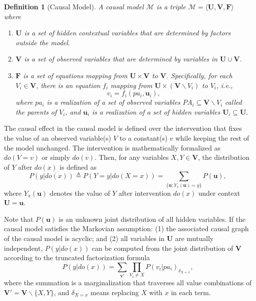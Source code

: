\documentclass{article}
\newtheorem{definition}{Definition}
\begin{document}
\begin{definition}[Causal Model]\label{def:cm}
A causal model $\mathcal{M}$ is a triple $\mathcal{M} = \langle \mathbf{U},\mathbf{V},\mathbf{F} \rangle$ where
\begin{enumerate}
	\item $\mathbf{U}$ is a set of hidden contextual variables that are determined by factors outside the model. %
	\item $\mathbf{V}$ is a set of observed variables that are determined by variables in $\mathbf{U}\cup\mathbf{V}$.
	\item $\mathbf{F}$ is a set of equations mapping from $\mathbf{U}\times \mathbf{V}$ to $\mathbf{V}$. Specifically, for each $V_{i}\in \mathbf{V}$, there is an equation $f_{i}$ mapping from $\mathbf{U}\times (\mathbf{V}\backslash V_{i})$ to $V_{i}$, i.e., 
	\begin{equation*}
	v_{i} = f_{i}(pa_{i},\mathbf{u}_{i}),
	\end{equation*}
	where $pa_{i}$ is a realization of a set of observed variables $PA_{i}\subseteq \mathbf{V}\backslash V_{i}$ called the parents of $V_{i}$, and $\mathbf{u}_{i}$ is a realization of a set of hidden variables $\mathbf{U}_{i}\subseteq \mathbf{U}$.
\end{enumerate}
\end{definition}

The causal effect in the causal model is defined over the intervention that fixes the value of an observed variable(s) $V$ to a constant(s) $v$ while keeping the rest of the model unchanged. The intervention is mathematically formalized as $do(V=v)$ or simply $do(v)$. Then, for any variables $X,Y\in \mathbf{V}$, the distribution of $Y$ after $do(x)$ is defined as \cite{pearl2009causality}
\begin{equation}\label{eq:pyx}
P(y|do(x)) \triangleq P(Y=y|do(X=x)) = \sum_{\{\mathbf{u}:Y_{x}(\mathbf{u})=y\}}P(\mathbf{u}),
\end{equation}
where $Y_{x}(\mathbf{u})$ denotes the value of $Y$ after intervention $do(x)$ under context $\mathbf{U}=\mathbf{u}$.

Note that $P(\mathbf{u})$ is an unknown joint distribution of all hidden variables. If the causal model satisfies the Markovian assumption: (1) the associated causal graph of the causal model is acyclic; and (2) all variables in $\mathbf{U}$ are mutually independent, $P(y|do(x))$ can be computed from the joint distribution of $\mathbf{V}$ according to the truncated factorization formula \cite{pearl2009causality}
\begin{equation}\label{eq:tff}
P(y|do(x)) = \sum_{\mathbf{v}'} \prod_{V_{i}\neq X}P(v_{i}|pa_{i})_{\delta_{X=x}},
\end{equation}
where the summation is a marginalization that traverses all value combinations of $\mathbf{V}'=\mathbf{V}\backslash \{X,Y\}$, and $\delta_{X=x}$ means replacing $X$ with $x$ in each term.
\end{document}
